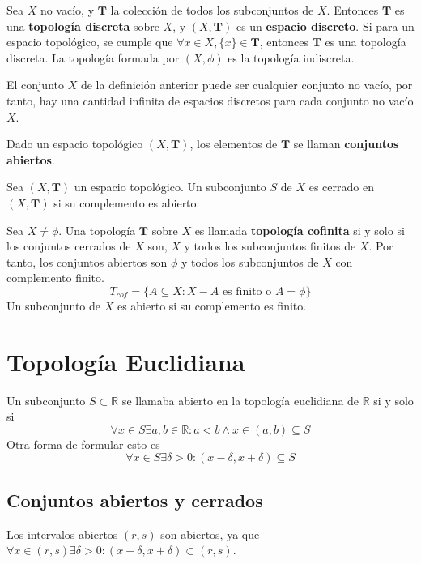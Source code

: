 \documentclass{../Topologia.tex}
\begin{document}
\begin{defin}
Sea $X$ no vacío, y $\mathbf{T}$ la colección de todos los subconjuntos de $X$. Entonces $\mathbf{T}$ es una \textbf{topología discreta} sobre $X$, y $(X,\mathbf{T})$ es un \textbf{espacio discreto}.
Si para un espacio topológico, se cumple que $\forall x \in X, \{ x \} \in \mathbf{T}$, entonces $\mathbf{T}$ es una topología discreta.
La topología formada por $(X,\phi)$ es la topología indiscreta.
\end{defin}

El conjunto $X$ de la definición anterior puede ser cualquier conjunto no vacío, por tanto, hay una cantidad infinita de espacios discretos para cada conjunto no vacío $X$.

\begin{defin}
Dado un espacio topológico $(X,\mathbf{T})$, los elementos de $\mathbf{T}$ se llaman \textbf{conjuntos abiertos}.
\end{defin}

\begin{defin}
Sea $(X, \mathbf{T})$ un espacio topológico. Un subconjunto $S$ de $X$ es cerrado en $(X,\mathbf{T})$ si su complemento es abierto.
\end{defin}

\begin{defin}
Sea $X\neq \phi$. Una topología $\mathbf{T}$ sobre $X$ es llamada \textbf{topología cofinita} si y solo si los conjuntos cerrados de $X$ son, $X$ y todos los subconjuntos finitos de $X$. Por tanto, los conjuntos abiertos son $\phi$ y todos los subconjuntos de $X$ con complemento finito.
$$
T_{cof}=\{ A \subseteq X : X-A \text{ es finito o }A=\phi \}
$$
Un subconjunto de $X$ es abierto si su complemento es finito.
\end{defin}

\section{Topología Euclidiana}

\begin{defin}
Un subconjunto $S\subset \mathbb{R}$ se llamaba abierto en la topología euclidiana de $\mathbb{R}$ si y solo si
$$
\forall x \in S \exists a,b \in \mathbb{R}:a<b \wedge x \in (a,b) \subseteq S
$$
Otra forma de formular esto es
$$
\forall x \in S \exists \delta > 0 : (x-\delta,x+\delta)\subseteq S
$$
\end{defin}

\subsection{Conjuntos abiertos y cerrados}
Los intervalos abiertos $(r,s)$ son abiertos, ya que $\forall x \in (r,s) \exists \delta > 0 : (x-\delta,x+\delta)\subset (r,s)$.
\end{document}
